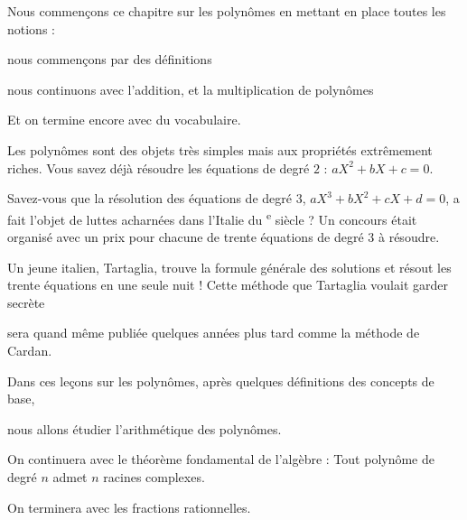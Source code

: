 






\debuttexte

\diapo

\change

Nous commençons ce chapitre sur les polynômes en mettant en place toutes
les notions :

\change

nous commençons par des définitions

\change

nous continuons avec l'addition, et la multiplication de polynômes

\change

Et on termine encore avec du vocabulaire. 


\diapo

Les polynômes sont des objets très simples mais aux propriétés extrêmement riches.
Vous savez déjà résoudre les équations de degré $2$ : $aX^2+bX+c=0$.

\change

Savez-vous que la résolution des équations de degré $3$, 
$aX^3+bX^2+cX+d=0$, a fait l'objet de luttes acharnées dans l'Italie 
du \textsc{}\textsuperscript{e} siècle ?
Un concours était organisé avec un prix pour chacune de trente équations 
de degré $3$ à résoudre.

\change

Un jeune italien, Tartaglia, trouve la formule générale des solutions
et résout les trente équations en une seule nuit ! Cette méthode que Tartaglia voulait garder secrète

\change

sera quand même publiée quelques années plus tard comme la \og méthode de Cardan\fg.

\change


Dans ces leçons sur les polynômes, après quelques définitions des concepts de base, 

nous allons étudier l'arithmétique des polynômes.

On continuera avec le théorème fondamental de l'algèbre :
\og Tout polynôme de degré $n$ admet $n$ racines complexes. \fg \ 

On terminera avec les fractions rationnelles.


